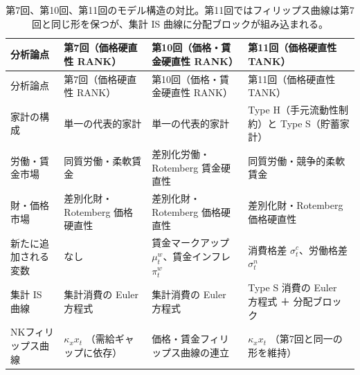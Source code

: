 \documentclass[
  japanese,
  lualatex,
  ja=standard,
  12pt,
  a4paper]{ltjsarticle}
\begin{document}
\begin{longtable}[]{@{}
  >{\raggedright\arraybackslash}p{}
  >{\raggedright\arraybackslash}p{}
  >{\raggedright\arraybackslash}p{}
  >{\raggedright\arraybackslash}p{}@{}}
\caption{第7回、第10回、第11回のモデル構造の対比。第11回ではフィリップス曲線は第7回と同じ形を保つが、集計
IS 曲線に分配ブロックが組み込まれる。}\tabularnewline
\toprule\noalign{}
\begin{minipage}[b]{\linewidth}\raggedright
分析論点
\end{minipage} & \begin{minipage}[b]{\linewidth}\raggedright
第7回（価格硬直性 RANK）
\end{minipage} & \begin{minipage}[b]{\linewidth}\raggedright
第10回（価格・賃金硬直性 RANK）
\end{minipage} & \begin{minipage}[b]{\linewidth}\raggedright
第11回（価格硬直性 TANK）
\end{minipage} \\
\midrule\noalign{}
\endfirsthead
\toprule\noalign{}
\begin{minipage}[b]{\linewidth}\raggedright
分析論点
\end{minipage} & \begin{minipage}[b]{\linewidth}\raggedright
第7回（価格硬直性 RANK）
\end{minipage} & \begin{minipage}[b]{\linewidth}\raggedright
第10回（価格・賃金硬直性 RANK）
\end{minipage} & \begin{minipage}[b]{\linewidth}\raggedright
第11回（価格硬直性 TANK）
\end{minipage} \\
\midrule\noalign{}
\endhead
\bottomrule\noalign{}
\endlastfoot
家計の構成 & 単一の代表的家計 & 単一の代表的家計 & Type
H（手元流動性制約）と Type S（貯蓄家計） \\
労働・賃金市場 & 同質労働・柔軟賃金 & 差別化労働・Rotemberg 賃金硬直性 &
同質労働・競争的柔軟賃金 \\
財・価格市場 & 差別化財・Rotemberg 価格硬直性 & 差別化財・Rotemberg
価格硬直性 & 差別化財・Rotemberg 価格硬直性 \\
新たに追加される変数 & なし & 賃金マークアップ \(\mu_t^w\)、賃金インフレ
\(\pi_t^w\) & 消費格差 \(\sigma_t^c\)、労働格差 \(\sigma_t^n\) \\
集計 IS 曲線 & 集計消費の Euler 方程式 & 集計消費の Euler 方程式 & Type
S 消費の Euler 方程式 ＋ 分配ブロック \\
NKフィリップス曲線 & \(\kappa_x x_t\) （需給ギャップに依存） &
価格・賃金フィリップス曲線の連立 & \(\kappa_x x_t\)
（第7回と同一の形を維持） \\
\end{longtable}
\end{document}
